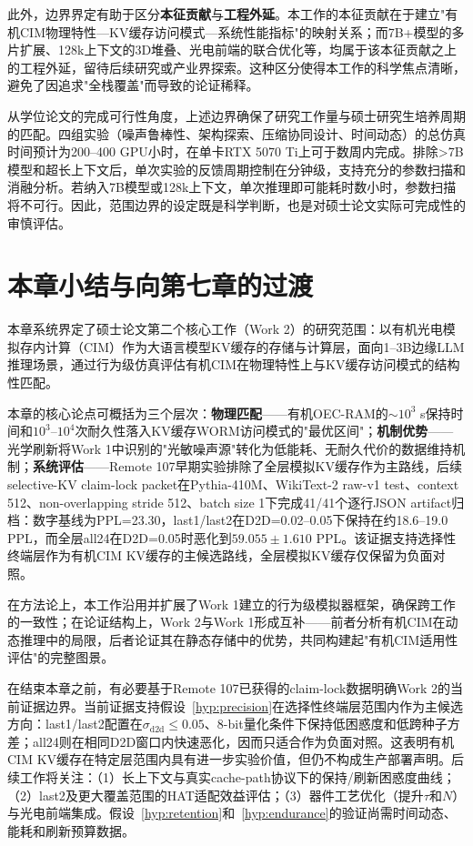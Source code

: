 此外，边界界定有助于区分\textbf{本征贡献}与\textbf{工程外延}。本工作的本征贡献在于建立"有机CIM物理特性—KV缓存访问模式—系统性能指标"的映射关系；而7B+模型的多片扩展、128k上下文的3D堆叠、光电前端的联合优化等，均属于该本征贡献之上的工程外延，留待后续研究或产业界探索。这种区分使得本工作的科学焦点清晰，避免了因追求"全栈覆盖"而导致的论证稀释。

从学位论文的完成可行性角度，上述边界确保了研究工作量与硕士研究生培养周期的匹配。四组实验（噪声鲁棒性、架构探索、压缩协同设计、时间动态）的总仿真时间预计为200--400 GPU小时，在单卡RTX 5070 Ti上可于数周内完成。排除>7B模型和超长上下文后，单次实验的反馈周期控制在分钟级，支持充分的参数扫描和消融分析。若纳入7B模型或128k上下文，单次推理即可能耗时数小时，参数扫描将不可行。因此，范围边界的设定既是科学判断，也是对硕士论文实际可完成性的审慎评估。


\section{本章小结与向第七章的过渡}
\label{sec:work2_summary}

本章系统界定了硕士论文第二个核心工作（Work 2）的研究范围：以有机光电模拟存内计算（CIM）作为大语言模型KV缓存的存储与计算层，面向1–3B边缘LLM推理场景，通过行为级仿真评估有机CIM在物理特性上与KV缓存访问模式的结构性匹配。

本章的核心论点可概括为三个层次：\textbf{物理匹配}——有机OEC-RAM的$\sim$$10^3$ s保持时间和$10^3$–$10^4$次耐久性落入KV缓存WORM访问模式的"最优区间"；\textbf{机制优势}——光学刷新将Work 1中识别的"光敏噪声源"转化为低能耗、无耐久代价的数据维持机制；\textbf{系统评估}——Remote 107早期实验排除了全层模拟KV缓存作为主路线，后续selective-KV claim-lock packet在Pythia-410M、WikiText-2 raw-v1 test、context 512、non-overlapping stride 512、batch size 1下完成41/41个逐行JSON artifact归档：数字基线为PPL=23.30，last1/last2在D2D=0.02--0.05下保持在约18.6--19.0 PPL，而全层all24在D2D=0.05时恶化到$59.055\pm1.610$ PPL。该证据支持选择性终端层作为有机CIM KV缓存的主候选路线，全层模拟KV缓存仅保留为负面对照。

在方法论上，本工作沿用并扩展了Work 1建立的行为级模拟器框架，确保跨工作的一致性；在论证结构上，Work 2与Work 1形成互补——前者分析有机CIM在动态推理中的局限，后者论证其在静态存储中的优势，共同构建起"有机CIM适用性评估"的完整图景。

在结束本章之前，有必要基于Remote 107已获得的claim-lock数据明确Work 2的当前证据边界。当前证据支持假设~\ref{hyp:precision}在选择性终端层范围内作为主候选方向：last1/last2配置在$\sigma_{\text{d2d}} \leq 0.05$、8-bit量化条件下保持低困惑度和低跨种子方差；all24则在相同D2D窗口内快速恶化，因而只适合作为负面对照。这表明有机CIM KV缓存在特定层范围内具有进一步实验价值，但仍不构成生产部署声明。后续工作将关注：（1）长上下文与真实cache-path协议下的保持/刷新困惑度曲线；（2）last2及更大覆盖范围的HAT适配效益评估；（3）器件工艺优化（提升$\tau$和$N$）与光电前端集成。假设~\ref{hyp:retention}和~\ref{hyp:endurance}的验证尚需时间动态、能耗和刷新预算数据。

